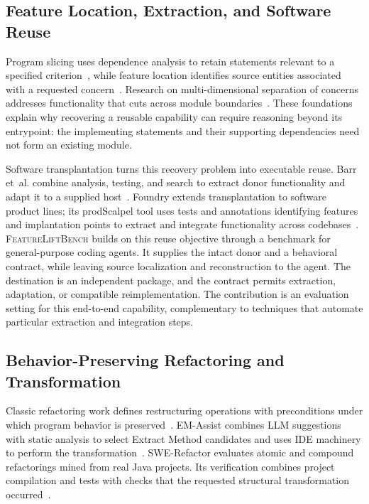 \documentclass[acmsmall,screen,review,anonymous]{acmart}
\newcommand{\flb}{\textsc{FeatureLiftBench}\xspace}
\begin{document}
\subsection{Feature Location, Extraction, and Software Reuse}

Program slicing uses dependence analysis to retain statements relevant to a
specified criterion~\cite{weiser1984slicing}, while feature location identifies
source entities associated with a requested concern~\cite{dit2013featurelocation}.
Research on multi-dimensional separation of concerns addresses functionality
that cuts across module boundaries~\cite{tarr1999degrees}. These foundations
explain why recovering a reusable capability can require reasoning beyond its
entrypoint: the implementing statements and their supporting dependencies need
not form an existing module.

Software transplantation turns this recovery problem into executable reuse.
Barr et~al. combine analysis, testing, and search to extract donor functionality
and adapt it to a supplied host~\cite{barr2015transplantation}. Foundry extends
transplantation to software product lines; its prodScalpel tool uses tests and
annotations identifying features and implantation points to extract and
integrate functionality across codebases~\cite{souza2025foundry}.
\flb builds on this reuse objective through a benchmark for general-purpose
coding agents. It supplies the intact donor and a behavioral contract, while
leaving source localization and reconstruction to the agent. The destination is
an independent package, and the contract permits extraction, adaptation, or
compatible reimplementation. The contribution is an evaluation setting for this
end-to-end capability, complementary to techniques that automate particular
extraction and integration steps.

\subsection{Behavior-Preserving Refactoring and Transformation}

Classic refactoring work defines restructuring operations with preconditions
under which program behavior is preserved~\cite{opdyke1992refactoring}.
EM-Assist combines LLM suggestions with static analysis to
select Extract Method candidates and uses IDE machinery to perform the
transformation~\cite{pomian2024emassist}. SWE-Refactor evaluates atomic and
compound refactorings mined from real Java projects. Its verification combines
project compilation and tests with checks that the requested structural
transformation occurred~\cite{xu2026swerefactor}.
\end{document}
